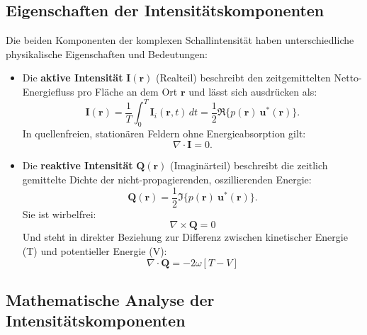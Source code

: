 \subsection{Eigenschaften der Intensitätskomponenten
\label{helmholtz:subsection:def_Schallintensitaet}}

Die beiden Komponenten der komplexen Schallintensität haben
unterschiedliche physikalische Eigenschaften und Bedeutungen:

\begin{itemize}
\item Die \textbf{aktive Intensität} $\boldsymbol{I}(\boldsymbol{r})$ (Realteil) beschreibt den zeitgemittelten Netto-Energiefluss pro Fläche an dem Ort $\boldsymbol{r}$ und lässt sich ausdrücken als:
\begin{equation}
\boldsymbol{I}(\boldsymbol{r})
=
\frac{1}{T}\int_0^T \boldsymbol{I}_i(\boldsymbol{r},t)\,dt
=
\frac{1}{2}\Re\{p(\boldsymbol{r})~\boldsymbol{u}^*(\boldsymbol{r})\}.
\end{equation}
In quellenfreien, stationären Feldern ohne Energieabsorption gilt:
\begin{equation}
\nabla \cdot \boldsymbol{I} = 0.
\end{equation}

\item Die \textbf{reaktive Intensität} $\boldsymbol{Q}(\boldsymbol{r})$ (Imaginärteil) beschreibt die zeitlich gemittelte Dichte der nicht-propagierenden, oszillierenden Energie: 
\begin{equation}
\boldsymbol{Q}(\boldsymbol{r}) = \frac{1}{2}\Im\{p(\boldsymbol{r})~\boldsymbol{u}^*(\boldsymbol{r})\}.
\label{helmholtz:equationReaktiveIntensitaet}
\end{equation}
Sie ist wirbelfrei:
\begin{equation}
\nabla \times \boldsymbol{Q} = 0
\end{equation}
Und steht in direkter Beziehung zur Differenz zwischen kinetischer Energie (T) und potentieller Energie (V):
\begin{equation}
\nabla \cdot \boldsymbol{Q} = -2 \omega [T-V]
\end{equation}
\end{itemize}


\subsection{Mathematische Analyse der Intensitätskomponenten
\label{helmholtz:subsection:def_Schallintensitaet}}

